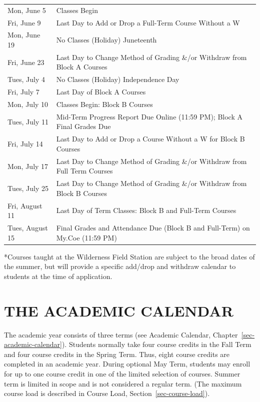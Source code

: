 \documentclass[
  letterpaper,
]{scrbook}
\renewcommand\toprule[2]\relax
\renewcommand\bottomrule[2]\relax
\begin{document}
\begin{longtable}[]{@{}
  >{\raggedright\arraybackslash}p{}
  >{\raggedleft\arraybackslash}p{}@{}}
\toprule\noalign{}
\endhead
\bottomrule\noalign{}
\endlastfoot
Mon, June 5 & Classes Begin \\
Fri, June 9 & Last Day to Add or Drop a Full-Term Course Without a W \\
Mon, June 19 & No Classes (Holiday) Juneteenth \\
Fri, June 23 & Last Day to Change Method of Grading \&/or Withdraw from
Block A Courses \\
Tues, July 4 & No Classes (Holiday) Independence Day \\
Fri, July 7 & Last Day of Block A Courses \\
Mon, July 10 & Classes Begin: Block B Courses \\
Tues, July 11 & Mid-Term Progress Report Due Online (11:59 PM); Block A
Final Grades Due \\
Fri, July 14 & Last Day to Add or Drop a Course Without a W for Block B
Courses \\
Mon, July 17 & Last Day to Change Method of Grading \&/or Withdraw from
Full Term Courses \\
Tues, July 25 & Last Day to Change Method of Grading \&/or Withdraw from
Block B Courses \\
Fri, August 11 & Last Day of Term Classes: Block B and Full-Term
Courses \\
Tues, August 15 & Final Grades and Attendance Due (Block B and
Full-Term) on My.Coe (11:59 PM) \\
\end{longtable}

*Courses taught at the Wilderness Field Station are subject to the broad
dates of the summer, but will provide a specific add/drop and withdraw
calendar to students at the time of application.

\chapter{THE ACADEMIC CALENDAR}\label{the-academic-calendar}

The academic year consists of three terms (see Academic Calendar,
Chapter~\ref{sec-academic-calendar}). Students normally take four course
credits in the Fall Term and four course credits in the Spring Term.
Thus, eight course credits are completed in an academic year. During
optional May Term, students may enroll for up to one course credit in
one of the limited selection of courses. Summer term is limited in scope
and is not considered a regular term. (The maximum course load is
described in Course Load, Section~\ref{sec-course-load}).
\end{document}
